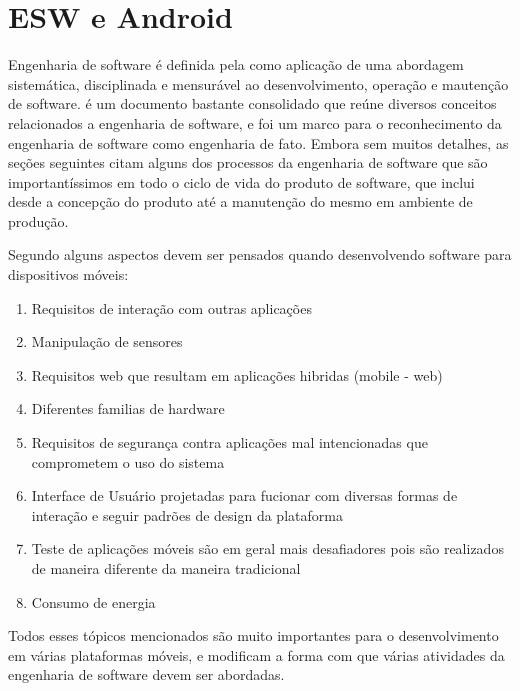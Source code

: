 \chapter{ESW e Android}
\label{cap:eswandroid}

Engenharia de software é definida pela  como aplicação de uma abordagem sistemática, disciplinada e mensurável ao desenvolvimento, operação e mautenção de software.  é um documento bastante consolidado que reúne diversos conceitos relacionados a engenharia de software, e foi um marco para o reconhecimento da engenharia de software como engenharia de fato. Embora sem muitos detalhes, as seções seguintes citam alguns dos processos da engenharia de software que são importantíssimos em todo o ciclo de vida do produto de software, que inclui desde a concepção do produto até a manutenção do mesmo em ambiente de produção.

Segundo  alguns aspectos devem ser pensados quando desenvolvendo software para dispositivos móveis:

\begin{enumerate}
\item Requisitos de interação com outras aplicações
\item Manipulação de sensores
\item Requisitos web que resultam em aplicações hibridas (mobile - web)
\item Diferentes familias de hardware
\item Requisitos de segurança contra aplicações mal intencionadas que comprometem o uso do sistema
\item Interface de Usuário projetadas para fucionar com diversas formas de interação e seguir padrões de design da plataforma
\item Teste de aplicações móveis são em geral mais desafiadores pois são realizados de maneira diferente da maneira tradicional
\item Consumo de energia
\end{enumerate}

Todos esses tópicos mencionados são muito importantes para o desenvolvimento em várias plataformas móveis, e modificam a forma com que várias atividades da engenharia de software devem ser abordadas.

